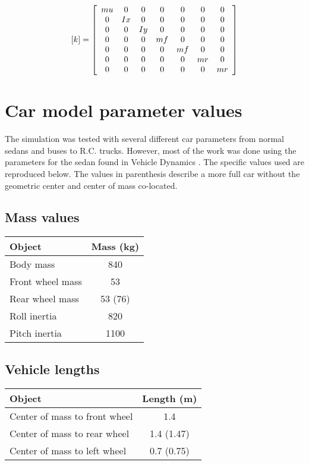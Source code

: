 \begin{equation*} \label{eq:full_car_k}
	[k] = \left[
		\begin{array}{c c c c c c c}
		mu & 0 & 0 & 0 & 0 & 0 & 0 \\
		0 & Ix & 0 & 0 & 0 & 0 & 0 \\
		0 & 0 & Iy & 0 & 0 & 0 & 0 \\
		0 & 0 & 0 & mf & 0 & 0 & 0 \\
		0 & 0 & 0 & 0 & mf & 0 & 0 \\
		0 & 0 & 0 & 0 & 0 & mr & 0 \\
		0 & 0 & 0 & 0 & 0 & 0 & mr \\
		\end{array}
	\right]
\end{equation*}

\section{Car model parameter values}
\label{a:parameters}
The simulation was tested with several different car parameters from normal sedans and buses to R.C. trucks. However, most of the work was done using the parameters for the sedan found in Vehicle Dynamics \cite{book:jazar}. The specific values used are reproduced below. The values in parenthesis describe a more full car without the geometric center and center of mass co-located.

\subsection{Mass values}
\begin{center}
\begin{tabular}{| l | c |}
\hline
Object & Mass (kg) \\
\hline
Body mass & 840 \\
Front wheel mass & 53 \\
Rear wheel mass & 53 (76) \\
Roll inertia & 820 \\
Pitch inertia & 1100 \\
\hline
\end{tabular}
\end{center}


\subsection{Vehicle lengths}
\begin{center}
\begin{tabular}{| l | c |}
\hline
Object & Length (m) \\
\hline
Center of mass to front wheel & 1.4 \\
Center of mass to rear wheel & 1.4 (1.47) \\
Center of mass to left wheel & 0.7 (0.75) \\
\hline
\end{tabular}
\end{center}

